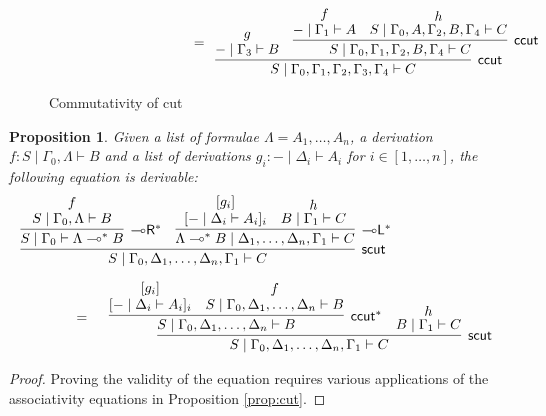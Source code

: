 \documentclass[sn-mathphys-num]{sn-jnl}%
\newcommand{\GG}{\Gamma}
\newcommand{\GD}{\Delta}
\newcommand{\GL}{\Lambda}
\newcommand{\vd}{\vdash}
\newcommand{\tr}{\otimes\mathsf{R}}
\newcommand{\lolli}{\multimap}
\newcommand{\lleft}{{\lolli}\mathsf{L}}
\newcommand{\lright}{{\lolli}\mathsf{R}}
\newcommand{\proofbox}[1]{\begin{tabular}{l} #1 \end{tabular}}
\newcommand{\mf}[1]{\mathsf{#1}}
\newcommand{\scut}[2]{\mf{scut} (#1 , #2)}
\theoremstyle{thmstyleone}%
\newtheorem{proposition}[theorem]{Proposition}%
\theoremstyle{thmstyletwo}%
\theoremstyle{thmstylethree}%
\begin{document}
\begin{figure}
\begin{displaymath}
\begin{array}{l}
      \qquad \qquad \qquad \qquad \qquad  =
      \begin{array}{c}
        \infer[\mf{ccut}]{S \mid \GG_0 , \GG_1 , \GG_2 , \GG_3 , \GG_4 \vd C}{
        \deduce{{-} \mid \GG_3 \vd B}{g}
        &
        \infer[\mf{ccut}]{S \mid \GG_0 , \GG_1 , \GG_2 , B , \GG_4 \vd C}{
        \deduce{{-} \mid \GG_1 \vd A}{f}
        &
        \deduce{S \mid \GG_0 , A , \GG_2 , B , \GG_4 \vd C}{h}
        }
        }
      \end{array}
    \end{array}
  \end{displaymath}
  \caption{Commutativity of cut}
  \label{fig:commcut}
\end{figure}

\begin{proposition}\label{scut-or-ols}
Given a list of formulae $\GL = A_1, \dots , A_n$, a derivation $f : S \mid \GG_0 , \GL \vd B$ and a list of derivations $g_i : {-} \mid \GD_i \vd A_i$ for $i \in [1,\dots , n]$, the following equation is derivable:
\begin{displaymath}
  \begin{array}{l}
    \infer[\mf{scut}]{S \mid \GG_0, \GD_1,\dots,\GD_n, \GG_1 \vd C}{
    \infer[\lright^*]{S \mid \GG_0 \vd \GL \lolli^* B}{
    \deduce{S \mid \GG_0 , \GL \vd B}{f}
    }
    &
    \infer[\lleft^*]{\GL \lolli^* B \mid \GD_1,\dots,\GD_n , \GG_1 \vd C}{
    \deduce{[ {-} \mid \GD_i \vd A_i]_i}{[g_i]}
    &
    \deduce{B \mid \GG_1 \vd C}{h}
    }
    }
    \\[10pt]
    \qquad \qquad
    =
    \proofbox{
    \infer[\mf{scut}]{S \mid \GG_0, \GD_1,\dots,\GD_n, \GG_1 \vd C}{
    \infer[\mf{ccut}^*]{S \mid \GG_0 , \GD_1,\dots,\GD_n \vd B}{
    \deduce{[ {-} \mid \GD_i \vd A_i]_i}{[g_i]}
    &
    \deduce{S \mid \GG_0 , \GD_1,\dots,\GD_n \vd B}{f}
    }
    &
    \deduce{B \mid \GG_1 \vd C}{h}
    }
    }
  \end{array}
\end{displaymath} 
\end{proposition}
\begin{proof}
  Proving the validity of the equation requires various applications of the associativity equations in Proposition \ref{prop:cut}.
\end{proof}
\end{document}
